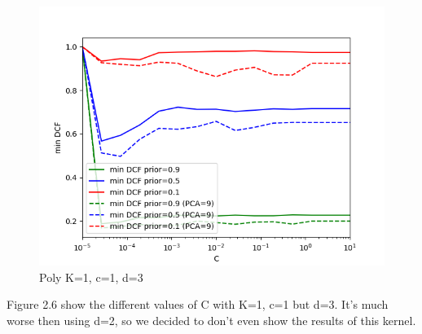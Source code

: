 \documentclass[english]{report}
\begin{document}
\begin{figure}[h!]
    \includegraphics[scale = 0.5]{../../images/validation/SVM_Poly_minDCF_comparison_K=1_c=1_d=3.png}
    \centering
    \caption{Poly K=1, c=1, d=3}
\end{figure}

Figure 2.6 show the different values of C with K=1, c=1 but d=3. It's much worse then using d=2, so 
we decided to don't even show the results of this kernel.
\end{document}
